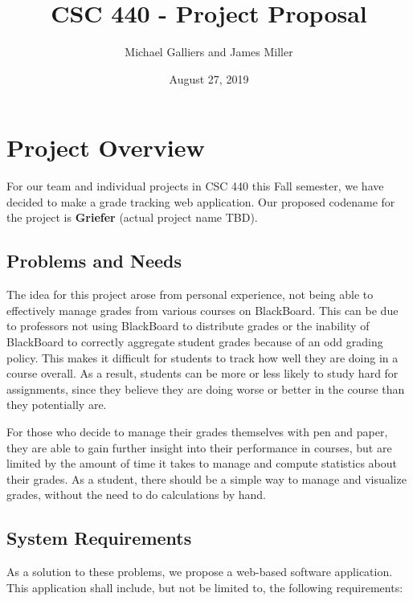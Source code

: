 \documentclass[12pt]{article}
\author{Michael Galliers and James Miller}
\title{CSC 440 - Project Proposal}
\date{August 27, 2019}
\begin{document}
\begin{titlepage}
\maketitle
\end{titlepage}

\newpage
    \tableofcontents
\newpage


\section{Project Overview}
For our team and individual projects in CSC 440 this Fall semester, we have decided to make a grade
tracking web application. Our proposed codename for the project is \textbf{Griefer} (actual project
name TBD).

\subsection{Problems and Needs}
The idea for this project arose from personal experience, not being able to effectively manage
grades from various courses on BlackBoard. This can be due to professors not using BlackBoard to
distribute grades or the inability of BlackBoard to correctly aggregate student grades because of
an odd grading policy. This makes it difficult for students to track how well they are doing in a
course overall. As a result, students can be more or less likely to study hard for assignments,
since they believe they are doing worse or better in the course than they potentially are.

For those who decide to manage their grades themselves with pen and paper, they are able to gain
further insight into their performance in courses, but are limited by the amount of time it takes to
manage and compute statistics about their grades. As a student, there should be a simple way to
manage and visualize grades, without the need to do calculations by hand.

\subsection{System Requirements}
As a solution to these problems, we propose a web-based software application. This application shall
include, but not be limited to, the following requirements:
\end{document}
